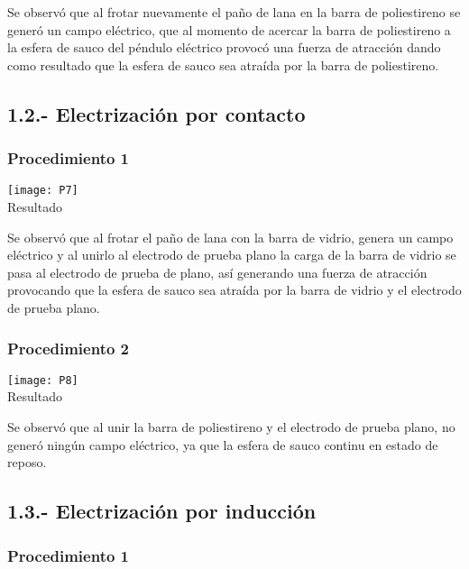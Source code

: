 \documentclass[10pt]{article}
\begin{document}
\begin{multicols}{2}
	Se observó que al frotar nuevamente el paño de lana en la barra de poliestireno se generó un campo eléctrico, que al momento de acercar la barra de poliestireno a la esfera de sauco del péndulo eléctrico provocó una fuerza de atracción dando como resultado que la esfera de sauco sea atraída por la barra de poliestireno.

	\subsection*{1.2.- Electrización por contacto}
	\subsubsection*{Procedimiento 1}

	\begin{center}
		\texttt{[image: P7]}\\
		Resultado
	\end{center}

	Se observó que al frotar el paño de lana con la barra de vidrio, genera un campo eléctrico y al unirlo al electrodo de prueba plano la carga de la barra de vidrio se pasa al electrodo de prueba de plano, así generando una fuerza de atracción provocando que la esfera de sauco sea atraída por la barra de vidrio y el electrodo de prueba plano.
	\subsubsection*{Procedimiento 2}

	\begin{center}
		\texttt{[image: P8]}\\
		Resultado
	\end{center}

	Se observó que al unir la barra de poliestireno y el electrodo de prueba plano, no generó ningún campo eléctrico, ya que la esfera de sauco  continu en estado de reposo.

	\subsection*{1.3.- Electrización por inducción}

	\subsubsection*{Procedimiento 1}

	\begin{center}


\end{center}
\end{multicols}
\end{document}
